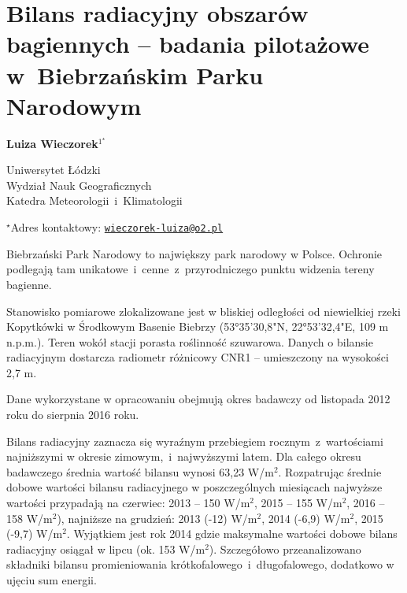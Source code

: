 \documentclass[\main/boa.tex]{subfiles}
\begin{document}
\section{Bilans radiacyjny obszarów bagiennych -- badania pilotażowe w~Biebrzańskim Parku Narodowym}

\begin{center}
  {\bf {} Luiza Wieczorek$^{1^\star}$}
\end{center}

\vskip 0.3cm

\begin{affiliations}
\begin{enumerate}
\begin{minipage}{0.915\textwidth}
\centering
\item Uniwersytet Łódzki \\ Wydział Nauk Geograficznych \\ Katedra Meteorologii~i~Klimatologii\\[-2pt]
\end{minipage}
\end{enumerate}
$^\star$Adres kontaktowy: \href{mailto:wieczorek-luiza@o2.pl}{\nolinkurl{wieczorek-luiza@o2.pl}}\\
\end{affiliations}

\vskip 0.5cm


\vskip 0.5cm

Biebrzański Park Narodowy to największy park narodowy w Polsce. Ochronie podlegają tam unikatowe~i~cenne~z~przyrodniczego punktu widzenia tereny bagienne. 

Stanowisko pomiarowe zlokalizowane jest w bliskiej odległości od niewielkiej rzeki Kopytkówki w Środkowym Basenie Biebrzy (53°35'30,8"N, 22°53'32,4"E, 109 m n.p.m.). Teren wokół stacji porasta roślinność szuwarowa. Danych o bilansie radiacyjnym dostarcza radiometr różnicowy CNR1 – umieszczony na wysokości 2,7 m. 

Dane wykorzystane w opracowaniu obejmują okres badawczy od listopada 2012 roku do sierpnia 2016 roku.

Bilans radiacyjny zaznacza się wyraźnym przebiegiem rocznym~z~wartościami najniższymi w okresie zimowym,~i~najwyższymi latem. Dla całego okresu badawczego średnia wartość bilansu wynosi 63,23 W/m$^{2}$. Rozpatrując średnie dobowe wartości bilansu radiacyjnego w poszczególnych miesiącach najwyższe wartości przypadają na czerwiec: 2013 -- 150 W/m$^{2}$, 2015 -- 155 W/m$^{2}$, 2016 -- 158 W/m$^{2}$), najniższe na grudzień: 2013 (-12) W/m$^{2}$, 2014               (-6,9) W/m$^{2}$, 2015 (-9,7) W/m$^{2}$. Wyjątkiem jest rok 2014 gdzie maksymalne wartości dobowe bilans radiacyjny osiągał w lipcu (ok. 153 W/m$^{2}$). Szczegółowo przeanalizowano składniki bilansu promieniowania krótkofalowego~i~długofalowego, dodatkowo w ujęciu sum energii. 
\end{document}
